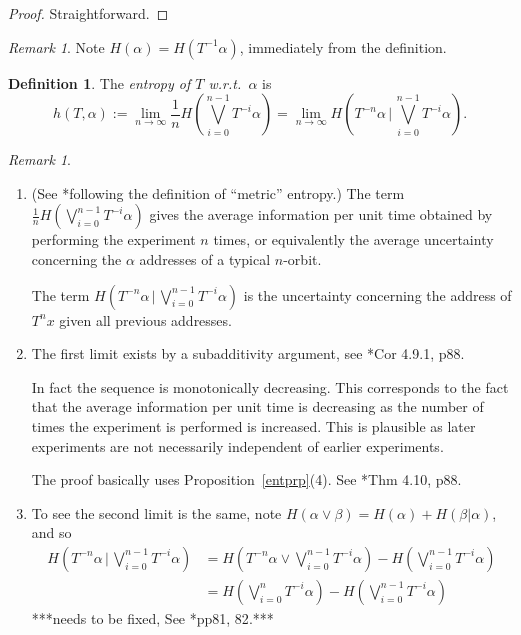 \documentclass[a4paper]{amsart}
\theoremstyle{plain}
\theoremstyle{definition}
\newtheorem{definition}[theorem]{Definition}%
\theoremstyle{remark}
\newtheorem{remark}[theorem]{Remark}
\begin{document}
 \begin{proof} Straightforward. \end{proof}

\begin{remark}
Note $ H(\alpha ) = H(T^{-1}  \alpha) $, immediately from the definition.
  \end{remark} 
 
 
\begin{definition} \label{defment} The \emph{entropy of $ T $ w.r.t.\ $ \alpha $} is
\[
h(T,\alpha) := \lim_{n\to \infty} \frac{1}{n}H\left(\bigvee_{i=0}^{n-1} T^{-i}\alpha  \right)
= \lim_{n\to \infty} H\left(T^{-n}\alpha\,  \bigg| \,  \bigvee_{i=0}^{n-1} T^{-i}\alpha  \right) .
\]
\end{definition}

\begin{remark} \mbox{}
\begin{enumerate}
\item (See \cite{You}*{following the definition of ``metric'' entropy}.) The term $ \frac{1}{n}H\left(\bigvee_{i=0}^{n-1} T^{-i}\alpha  \right) $ gives the average information per unit time obtained by performing the experiment $ n $ times, or equivalently the  average uncertainty concerning the $ \alpha  $ addresses  of a typical $ n $-orbit.  

The term $ H\left(T^{-n}\alpha\,  \bigg| \,  \bigvee_{i=0}^{n-1} T^{-i}\alpha  \right)  $ is the uncertainty concerning the address of $ T^n x $ given all previous addresses.
 


\item The first limit exists by a subadditivity argument, see \cite{Wal}*{Cor 4.9.1, p88}.
 
 In fact the sequence is monotonically decreasing. This corresponds  to the fact that  the average information per unit time is decreasing as the number of times the experiment is performed is increased.  This is plausible as later experiments are not necessarily independent of earlier experiments.

The proof basically uses Proposition~\ref{entprp}(4).
See \cite{Wal}*{Thm 4.10, p88}.

\item To see the second limit is the same, note $ H(\alpha \vee \beta)  = H(\alpha) + H(\beta | \alpha  ) $, and so
\begin{align*}
H\left(T^{-n}\alpha\,  \bigg| \,  \bigvee_{i=0}^{n-1} T^{-i}\alpha  \right) &=  
        H\left(  T^{-n} \alpha \vee \bigvee_{i=0}^{n-1} T^{-i}\alpha  \right)  
         -   H\left(\bigvee_{i=0}^{n-1} T^{-i}\alpha  \right) \\
         &=  H\left(\bigvee_{i=0}^{n } T^{-i}\alpha  \right)  -  H\left(\bigvee_{i=0}^{n-1} T^{-i}\alpha  \right)
\end{align*} 
***needs to be fixed, See \cite{Bil}*{pp81, 82}.***

\end{enumerate}  
 \end{remark}
 
\end{document}
